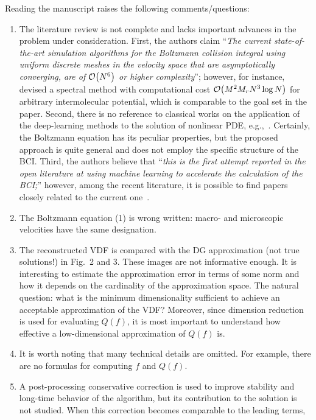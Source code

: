 \documentclass[11pt]{article}
\newcommand{\claim}[1]{``\emph{#1}''}
\begin{document}
Reading the manuscript raises the following comments/questions:
\begin{enumerate}
    \item The literature review is not complete and lacks important advances in the problem under consideration.
    First, the authors claim \claim{The current state-of-the-art simulation algorithms for the Boltzmann collision
    integral using uniform discrete meshes in the velocity space that are asymptotically converging,
    are of $\order{N^6}$ or higher complexity}; however, for instance, \citet{wu2015influence} devised a spectral method
    with computational cost $\order{M^2 M_r N^3 \log{N}}$ for arbitrary intermolecular potential,
    which is comparable to the goal set in the paper.
    Second, there is no reference to classical works on the application of the deep-learning methods to the solution of nonlinear
    PDE, e.g.,~\cite{weinan2017deep, sirignano2018dgm}. Certainly, the Boltzmann equation has its peculiar properties,
    but the proposed approach is quite general and does not employ the specific structure of the BCI.
    Third, the authors believe that \claim{this is the first attempt reported in the open literature
    at using machine learning to accelerate the calculation of the BCI;} however, among the recent literature,
    it is possible to find papers closely related to the current one~\cite{boelens2020tensor, lou2020physics}.
    \item The Boltzmann equation (1) is wrong written: macro- and microscopic velocities have the same designation.
    \item The reconstructed VDF is compared with the DG approximation (not true solutions!) in Fig.~2 and 3.
    These images are not informative enough. It is interesting to estimate the approximation error in terms of some norm
    and how it depends on the cardinality of the approximation space.
    The natural question: what is the minimum dimensionality sufficient to achieve an acceptable approximation of the VDF?
    Moreover, since dimension reduction is used for evaluating $Q(f)$,
    it is most important to understand how effective a low-dimensional approximation of $Q(f)$ is.
    \item It is worth noting that many technical details are omitted.
    For example, there are no formulas for computing $f$ and $Q(f)$.
    \item A post-processing conservative correction is used to improve stability and long-time behavior of the algorithm,
    but its contribution to the solution is not studied. When this correction becomes comparable to the leading terms,

\end{enumerate}
\end{document}
